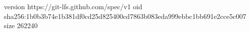 version https://git-lfs.github.com/spec/v1
oid sha256:1b0b3b74e1b381df0cd25d825400cd7863b083eda999ebbc1bb691e2cce5c007
size 262240
